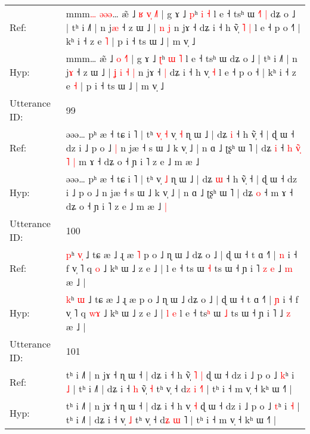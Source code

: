 \documentclass[10pt]{article}
\DeclareRobustCommand{\hl}[1]{{\textcolor{red}{#1}}}
\begin{document}
\begin{longtable}{ll}
Ref: & mmm\hl{…}\hl{ }\hl{ə}\hl{ə}\hl{ə}… æ̃ ˩\hl{ }\hl{ʁ} \hl{v}\hl{̩} \hl{˩}˥ | g ɤ ˩ \hl{p}ʰ \hl{i} \hl{˧} l e ˧ tsʰ ɯ\hl{ }\hl{˧}\hl{˥}\hl{ }\hl{|} dʑ o ˩ | tʰ i ˩˥ | n j\hl{æ} ˧ z ɯ ˩ |\hl{}\hl{}\hl{}\hl{} \hl{n} \hl{j} n jɤ ˧\hl{}\hl{} dʑ i ˧ h v\hl{̃}̩\hl{ }\hl{˥} \hl{|} l e ˧ p o ˧\hl{˥} | kʰ i ˧ z e \hl{˥} | p i ˧ ts ɯ ˩ | m v̩ ˩
 \\
Hyp: & mmm\hl{}\hl{}\hl{}\hl{}\hl{}… æ̃ ˩\hl{}\hl{} \hl{}\hl{o} \hl{˧}˥ | g ɤ ˩ \hl{ʈ}ʰ \hl{ɯ} \hl{˥} l e ˧ tsʰ ɯ\hl{}\hl{}\hl{}\hl{}\hl{} dʑ o ˩ | tʰ i ˩˥ | n j\hl{ɤ} ˧ z ɯ ˩ |\hl{ }\hl{ʝ}\hl{ }\hl{i} \hl{˧} \hl{|} n jɤ ˧\hl{ }\hl{|} dʑ i ˧ h v\hl{}̩\hl{}\hl{} \hl{˧} l e ˧ p o ˧\hl{} | kʰ i ˧ z e \hl{˧} | p i ˧ ts ɯ ˩ | m v̩ ˩
 \\
\midrule
Utterance ID: & 99 \\
Ref: & əəə… pʰ æ ˧ tɕ i ˥ | tʰ\hl{ }\hl{v}\hl{̩}\hl{ }\hl{˧} v̩ \hl{˧} ɳ ɯ ˩ | dʑ \hl{i} ˧ h ṽ̩ ˧ | ɖ ɯ ˧ dz i ˩ p o ˩\hl{ }\hl{|} n jæ ˧ s ɯ ˩ k v̩ ˩ | n ɑ ˩ ʈʂʰ ɯ ˥ | dʑ \hl{i} ˧\hl{ }\hl{h}\hl{ }\hl{v}\hl{̃}\hl{̩}\hl{ }\hl{˥}\hl{ }\hl{|} m ɤ ˧ dʑ o ˧ ɲ i ˥ z e ˩ m æ ˩\hl{}\hl{}
 \\
Hyp: & əəə… pʰ æ ˧ tɕ i ˥ | tʰ\hl{}\hl{}\hl{}\hl{}\hl{} v̩ \hl{˩} ɳ ɯ ˩ | dʑ \hl{ɯ} ˧ h ṽ̩ ˧ | ɖ ɯ ˧ dz i ˩ p o ˩\hl{}\hl{} n jæ ˧ s ɯ ˩ k v̩ ˩ | n ɑ ˩ ʈʂʰ ɯ ˥ | dʑ \hl{o} ˧\hl{}\hl{}\hl{}\hl{}\hl{}\hl{}\hl{}\hl{}\hl{}\hl{} m ɤ ˧ dʑ o ˧ ɲ i ˥ z e ˩ m æ ˩\hl{ }\hl{|}
 \\
\midrule
Utterance ID: & 100 \\
Ref: & \hl{p}ʰ \hl{v}\hl{̩} ˩ tɕ æ ˩ ɻ æ\hl{ }\hl{˥} p o ˩ ɳ ɯ ˩ dʑ o ˩ | ɖ ɯ ˧ t ɑ ˧˥ | \hl{n} i ˧ f v̩ ˥ q \hl{}\hl{o} ˩ kʰ ɯ ˩ z e ˩ |\hl{}\hl{}\hl{}\hl{} l e ˧ ts\hl{} ɯ \hl{˧} ts ɯ ˧ ɲ i ˥\hl{ }\hl{z}\hl{ }\hl{e} ˩ \hl{m} æ ˩ |
 \\
Hyp: & \hl{k}ʰ \hl{}\hl{ɯ} ˩ tɕ æ ˩ ɻ æ\hl{}\hl{} p o ˩ ɳ ɯ ˩ dʑ o ˩ | ɖ ɯ ˧ t ɑ ˧˥ | \hl{ɲ} i ˧ f v̩ ˥ q \hl{w}\hl{ɤ} ˩ kʰ ɯ ˩ z e ˩ |\hl{ }\hl{l}\hl{ }\hl{e} l e ˧ ts\hl{ʰ} ɯ \hl{˩} ts ɯ ˧ ɲ i ˥\hl{}\hl{}\hl{}\hl{} ˩ \hl{z} æ ˩ |
 \\
\midrule
Utterance ID: & 101 \\
Ref: & tʰ i ˩˥ | n jɤ ˧ ɳ ɯ ˧ | dʑ i ˧ h v\hl{̃}̩\hl{ }\hl{˥} \hl{|} ɖ ɯ ˧ dz i ˩ p o ˩ \hl{k}ʰ i \hl{˩} | tʰ i ˩˥ | dʑ i ˧\hl{ }\hl{h} v\hl{̃}̩ \hl{˧} tʰ v̩ ˧ d\hl{z} \hl{i} \hl{˧}˥ | tʰ i ˧ m v̩ ˧ kʰ ɯ ˧˥ |
 \\
Hyp: & tʰ i ˩˥ | n jɤ ˧ ɳ ɯ ˧ | dʑ i ˧ h v\hl{}̩\hl{}\hl{} \hl{˧} ɖ ɯ ˧ dz i ˩ p o ˩ \hl{t}ʰ i \hl{˧} | tʰ i ˩˥ | dʑ i ˧\hl{}\hl{} v\hl{}̩ \hl{˩} tʰ v̩ ˧ d\hl{ʑ} \hl{ɯ} \hl{}˥ | tʰ i ˧ m v̩ ˧ kʰ ɯ ˧˥ |

\end{longtable}
\end{document}
